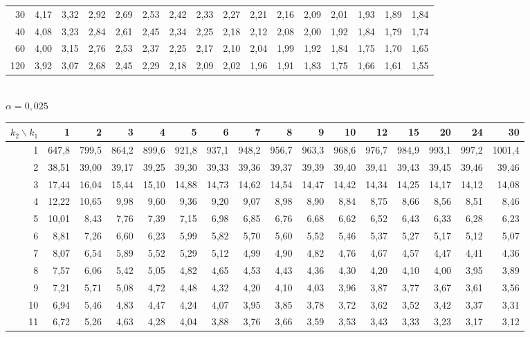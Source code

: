 \documentclass[a4paper,10pt]{extarticle}
\begin{document}
\begin{center}
\begin{tabular}{r|rrrrrrrrrrrrrrr}
30 & 4,17 & 3,32 & 2,92 & 2,69 & 2,53 & 2,42 & 2,33 & 2,27 & 2,21 & 2,16 & 2,09 & 2,01 & 1,93 & 1,89 & 1,84\\
40 & 4,08 & 3,23 & 2,84 & 2,61 & 2,45 & 2,34 & 2,25 & 2,18 & 2,12 & 2,08 & 2,00 & 1,92 & 1,84 & 1,79 & 1,74\\
60 & 4,00 & 3,15 & 2,76 & 2,53 & 2,37 & 2,25 & 2,17 & 2,10 & 2,04 & 1,99 & 1,92 & 1,84 & 1,75 & 1,70 & 1,65\\
120 & 3,92 & 3,07 & 2,68 & 2,45 & 2,29 & 2,18 & 2,09 & 2,02 & 1,96 & 1,91 & 1,83 & 1,75 & 1,66 & 1,61 & 1,55\\
\end{tabular}\\[5pt]
\textbf{$\alpha=0{,}025$}\\[1pt]
\begin{tabular}{r|rrrrrrrrrrrrrrr}
$k_2\backslash k_1$ & 1 & 2 & 3 & 4 & 5 & 6 & 7 & 8 & 9 & 10 & 12 & 15 & 20 & 24 & 30\\\hline
1 & 647,8 & 799,5 & 864,2 & 899,6 & 921,8 & 937,1 & 948,2 & 956,7 & 963,3 & 968,6 & 976,7 & 984,9 & 993,1 & 997,2 & 1001,4\\
2 & 38,51 & 39,00 & 39,17 & 39,25 & 39,30 & 39,33 & 39,36 & 39,37 & 39,39 & 39,40 & 39,41 & 39,43 & 39,45 & 39,46 & 39,46\\
3 & 17,44 & 16,04 & 15,44 & 15,10 & 14,88 & 14,73 & 14,62 & 14,54 & 14,47 & 14,42 & 14,34 & 14,25 & 14,17 & 14,12 & 14,08\\
4 & 12,22 & 10,65 & 9,98 & 9,60 & 9,36 & 9,20 & 9,07 & 8,98 & 8,90 & 8,84 & 8,75 & 8,66 & 8,56 & 8,51 & 8,46\\
5 & 10,01 & 8,43 & 7,76 & 7,39 & 7,15 & 6,98 & 6,85 & 6,76 & 6,68 & 6,62 & 6,52 & 6,43 & 6,33 & 6,28 & 6,23\\
6 & 8,81 & 7,26 & 6,60 & 6,23 & 5,99 & 5,82 & 5,70 & 5,60 & 5,52 & 5,46 & 5,37 & 5,27 & 5,17 & 5,12 & 5,07\\
7 & 8,07 & 6,54 & 5,89 & 5,52 & 5,29 & 5,12 & 4,99 & 4,90 & 4,82 & 4,76 & 4,67 & 4,57 & 4,47 & 4,41 & 4,36\\
8 & 7,57 & 6,06 & 5,42 & 5,05 & 4,82 & 4,65 & 4,53 & 4,43 & 4,36 & 4,30 & 4,20 & 4,10 & 4,00 & 3,95 & 3,89\\
9 & 7,21 & 5,71 & 5,08 & 4,72 & 4,48 & 4,32 & 4,20 & 4,10 & 4,03 & 3,96 & 3,87 & 3,77 & 3,67 & 3,61 & 3,56\\
10 & 6,94 & 5,46 & 4,83 & 4,47 & 4,24 & 4,07 & 3,95 & 3,85 & 3,78 & 3,72 & 3,62 & 3,52 & 3,42 & 3,37 & 3,31\\
11 & 6,72 & 5,26 & 4,63 & 4,28 & 4,04 & 3,88 & 3,76 & 3,66 & 3,59 & 3,53 & 3,43 & 3,33 & 3,23 & 3,17 & 3,12\\

\end{tabular}
\end{center}
\end{document}
